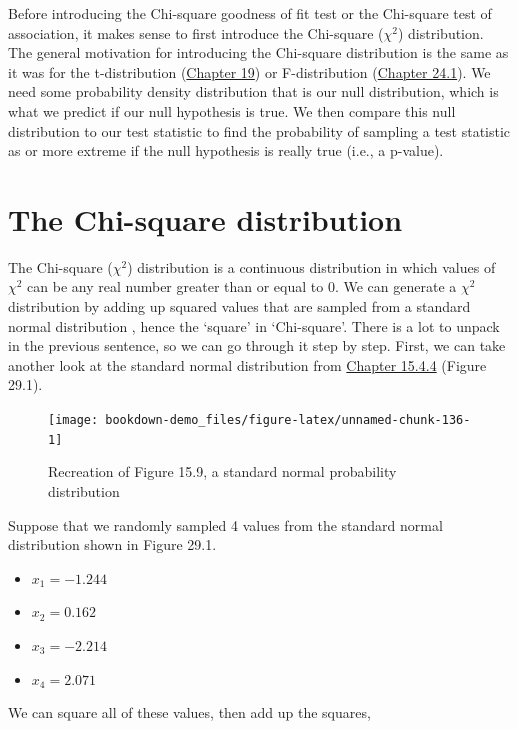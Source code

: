 \documentclass[
]{scrbook}
\providecommand{\tightlist}{%
  \setlength{\itemsep}{0pt}\setlength{\parskip}{0pt}}
\begin{document}
Before introducing the Chi-square goodness of fit test or the Chi-square test of association, it makes sense to first introduce the Chi-square (\(\chi^{2}\)) distribution.
The general motivation for introducing the Chi-square distribution is the same as it was for the t-distribution (\protect\hyperlink{Chapter_19}{Chapter 19}) or F-distribution (\protect\hyperlink{the-f-distribution}{Chapter 24.1}).
We need some probability density distribution that is our null distribution, which is what we predict if our null hypothesis is true.
We then compare this null distribution to our test statistic to find the probability of sampling a test statistic as or more extreme if the null hypothesis is really true (i.e., a p-value).

\hypertarget{the-chi-square-distribution}{%
\section{The Chi-square distribution}\label{the-chi-square-distribution}}

The Chi-square (\(\chi^{2}\)) distribution is a continuous distribution in which values of \(\chi^{2}\) can be any real number greater than or equal to 0. We can generate a \(\chi^{2}\) distribution by adding up squared values that are sampled from a standard normal distribution \citep{Sokal1995}, hence the `square' in `Chi-square'.
There is a lot to unpack in the previous sentence, so we can go through it step by step.
First, we can take another look at the standard normal distribution from \protect\hyperlink{normal-distribution}{Chapter 15.4.4} (Figure 29.1).

\begin{figure}
\texttt{[image: bookdown-demo\_files/figure-latex/unnamed-chunk-136-1]} \caption{Recreation of Figure 15.9, a standard normal probability distribution}\label{fig:unnamed-chunk-136}
\end{figure}

Suppose that we randomly sampled 4 values from the standard normal distribution shown in Figure 29.1.

\begin{itemize}
\tightlist
\item
  \(x_{1} = -1.244\)
\item
  \(x_{2} = 0.162\)
\item
  \(x_{3} = -2.214\)
\item
  \(x_{4} = 2.071\)
\end{itemize}

We can square all of these values, then add up the squares,
\end{document}
